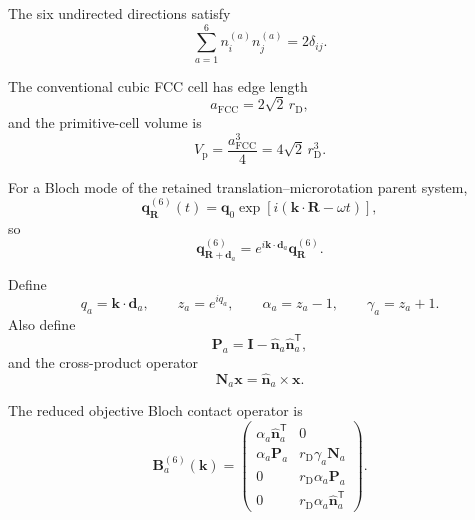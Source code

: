 The six undirected directions satisfy
\begin{equation}
    \sum_{a=1}^{6} n_i^{(a)}n_j^{(a)} = 2\delta_{ij}.
\end{equation}

The conventional cubic FCC cell has edge length
\begin{equation}
    a_{\mathrm{FCC}}=2\sqrt{2}\,r_{\mathrm{D}},
\end{equation}
and the primitive-cell volume is
\begin{equation}
    V_{\mathrm{p}}=\frac{a_{\mathrm{FCC}}^3}{4}=4\sqrt{2}\,r_{\mathrm{D}}^3.
\end{equation}

For a Bloch mode of the retained translation--microrotation parent system,
\begin{equation}
    \mathbf{q}_{\mathbf{R}}^{(6)}(t)=\mathbf{q}_0 \exp[i(\mathbf{k}\cdot\mathbf{R}-\omega t)],
\end{equation}
so
\begin{equation}
    \mathbf{q}_{\mathbf{R}+\mathbf{d}_a}^{(6)} = e^{i\mathbf{k}\cdot\mathbf{d}_a} \mathbf{q}_{\mathbf{R}}^{(6)}.
\end{equation}

Define
\begin{equation}
    q_a = \mathbf{k}\cdot\mathbf{d}_a, \qquad z_a=e^{iq_a}, \qquad \alpha_a=z_a-1, \qquad \gamma_a=z_a+1.
\end{equation}
Also define
\begin{equation}
    \mathbf{P}_a = \mathbf{I}-\hat{\mathbf{n}}_a\hat{\mathbf{n}}_a^{\mathsf{T}},
\end{equation}
and the cross-product operator
\begin{equation}
    \mathbf{N}_a\mathbf{x} = \hat{\mathbf{n}}_a\times\mathbf{x}.
\end{equation}

The reduced objective Bloch contact operator is
\begin{equation}
    \boxed{
    \mathbf{B}_a^{(6)}(\mathbf{k})
    =
    \begin{pmatrix}
        \alpha_a\hat{\mathbf{n}}_a^{\mathsf{T}} & 0\\
        \alpha_a\mathbf{P}_a & r_{\mathrm{D}}\gamma_a\mathbf{N}_a\\
        0 & r_{\mathrm{D}}\alpha_a\mathbf{P}_a\\
        0 & r_{\mathrm{D}}\alpha_a\hat{\mathbf{n}}_a^{\mathsf{T}}
    \end{pmatrix}.
    }
\end{equation}

